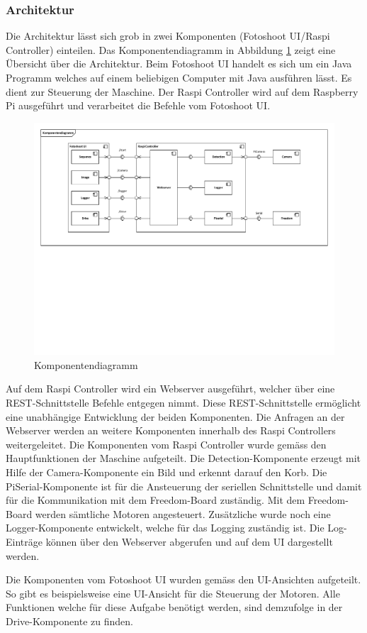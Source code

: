 \subsubsection{Architektur}

Die Architektur lässt sich grob in zwei Komponenten (Fotoshoot UI/Raspi Controller) einteilen. Das Komponentendiagramm in Abbildung \ref{fig:komponentendiagramm} zeigt eine Übersicht über die Architektur. Beim Fotoshoot UI handelt es sich um ein Java Programm welches auf einem beliebigen Computer mit Java ausführen lässt. Es dient zur Steuerung der Maschine. Der Raspi Controller wird auf dem Raspberry Pi ausgeführt und verarbeitet die Befehle vom Fotoshoot UI.

\begin{figure}
	\centering
	\includegraphics[width=\linewidth]{../../fig/komponentendiagramm}
	\caption{Komponentendiagramm}
	\label{fig:komponentendiagramm}
\end{figure}

Auf dem Raspi Controller wird ein Webserver ausgeführt, welcher über eine REST-Schnittstelle Befehle entgegen nimmt. Diese REST-Schnittstelle ermöglicht eine unabhängige Entwicklung der beiden Komponenten. Die Anfragen an der Webserver werden an weitere Komponenten innerhalb des Raspi Controllers weitergeleitet. Die Komponenten vom Raspi Controller wurde gemäss den Hauptfunktionen der Maschine aufgeteilt. Die Detection-Komponente erzeugt mit Hilfe der Camera-Komponente ein Bild und erkennt darauf den Korb. Die PiSerial-Komponente ist für die Ansteuerung der seriellen Schnittstelle und damit für die Kommunikation mit dem Freedom-Board zuständig. Mit dem Freedom-Board werden sämtliche Motoren angesteuert. Zusätzliche wurde noch eine Logger-Komponente entwickelt, welche für das Logging zuständig ist. Die Log-Einträge können über den Webserver abgerufen und auf dem UI dargestellt werden.

Die Komponenten vom Fotoshoot UI wurden gemäss den UI-Ansichten aufgeteilt. So gibt es beispielsweise eine UI-Ansicht für die Steuerung der Motoren. Alle Funktionen welche für diese Aufgabe benötigt werden, sind demzufolge in der Drive-Komponente zu finden.